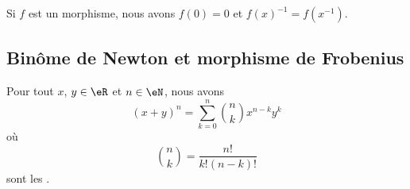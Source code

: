 Si \( f\) est un morphisme, nous avons \( f(0)=0\) et \( f(x)^{-1}=f(x^{-1})\).

\subsection{Binôme de Newton et morphisme de Frobenius}

\begin{proposition}     \label{PropBinomFExOiL}
Pour tout $x$, $y\in\eR$ et $n\in\eN$, nous avons
\begin{equation}        \label{EqNewtonB}
    (x+y)^n=\sum_{k=0}^n{n\choose k}x^{n-k}y^k
\end{equation}
où
\begin{equation}
    {n\choose k}=\frac{ n! }{ k!(n-k)! }
\end{equation}
sont les .
\end{proposition}

